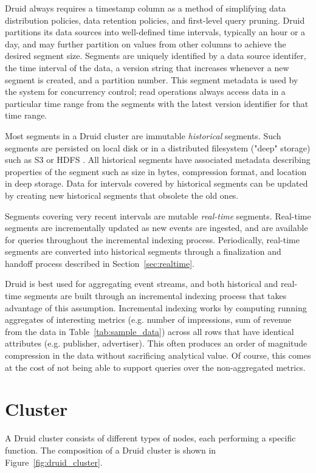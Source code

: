 \documentclass{vldb}
\begin{document}
Druid always requires a timestamp column as a method of simplifying data distribution policies, data retention policies, and first-level query pruning. Druid partitions its data sources into well-defined time intervals, typically an hour or a day, and may further partition on values from other columns to achieve the desired segment size. Segments are uniquely identified by a data source
identifer, the time interval of the data, a version string that increases whenever a new segment is created, and a partition number. This segment metadata is used by the system for concurrency control; read operations always access data in a particular time range
from the segments with the latest version identifier for that time
range.

Most segments in a Druid cluster are immutable \emph{historical} segments. Such segments are persisted on local disk or in a distributed filesystem ("deep" storage) such as S3 \cite{decandia2007dynamo} or HDFS \cite{shvachko2010hadoop}. All historical
segments have associated metadata describing properties of the segment
such as size in bytes, compression format, and location in deep
storage. Data for intervals covered by historical segments can be updated by creating new historical segments that obsolete the old ones.

Segments covering very recent intervals are mutable \emph{real-time} segments. Real-time segments are incrementally updated as new events are ingested, and are available for queries throughout the incremental indexing process. Periodically, real-time segments are converted into
historical segments through a finalization and handoff process described in Section~\ref{sec:realtime}.

Druid is best used for aggregating event streams, and both historical and real-time segments are built through an incremental indexing process that takes advantage of this assumption. Incremental indexing works by computing running aggregates of interesting metrics (e.g. number of impressions, sum of revenue from the data in Table~\ref{tab:sample_data}) across all rows that have identical attributes (e.g. publisher, advertiser). This often produces an order of magnitude compression in the data without sacrificing analytical value. Of course, this comes at the cost of not being able to support queries over the non-aggregated metrics.

\section{Cluster}
\label{sec:cluster}
A Druid cluster consists of different types of nodes, each performing
a specific function. The composition of a Druid cluster is shown in
Figure~\ref{fig:druid_cluster}.
\end{document}
